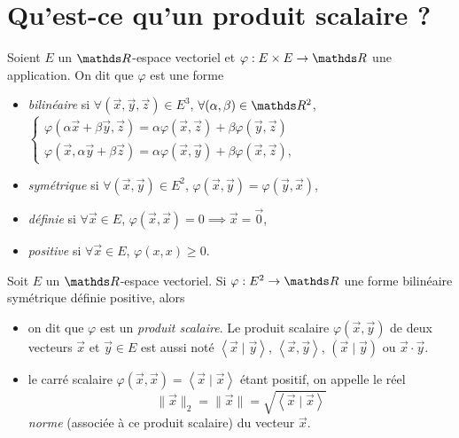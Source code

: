 \section{Qu'est-ce qu'un produit scalaire ?}

\begin{defn}
	Soient $E$\/ un $\R$-espace vectoriel et $\varphi : E \times E \to \R$\/ une application. On dit que $\varphi$\/ est une forme
	\begin{itemize}
		\item \textit{bilinéaire} si $\forall (\vec{x},\vec{y},\vec{z}) \in E^3$, $\forall (\alpha, \beta) \in \R^2$,  $\begin{cases}
				\varphi(\alpha \vec{x} + \beta \vec{y}, \vec{z}) = \alpha \varphi(\vec{x},\vec{z}) + \beta \varphi(\vec{y}, \vec{z})\\
				\varphi(\vec{x}, \alpha \vec{y} + \beta \vec{z}) = \alpha \varphi(\vec{x}, \vec{y}) + \beta \varphi(\vec{x},\vec{z}),
			\end{cases}$ 
		\item \textit{symétrique} si $\forall (\vec{x},\vec{y}) \in E^2$, $\varphi(\vec{x},\vec{y}) = \varphi(\vec{y},\vec{x})$,
		\item \textit{définie} si $\forall \vec{x} \in E$, \quad $\varphi(\vec{x},\vec{x}) = 0 \implies \vec{x} = \vec{0}$,
		\item \textit{positive} si $\forall \vec{x} \in E$, $\varphi(x,x) \ge 0$.
	\end{itemize}
\end{defn}

\begin{defn}
	Soit $E$\/ un $\R$-espace vectoriel. Si $\varphi : E^2 \to \R$\/ une forme bilinéaire symétrique définie positive, alors
	\begin{itemize}
		\item on dit que $\varphi$\/ est un \textit{produit scalaire}. Le produit scalaire $\varphi(\vec{x}, \vec{y})$\/ de deux vecteurs $\vec{x}$\/ et $\vec{y} \in E$\/ est aussi noté $\left<\vec{x} \mid \vec{y} \right>$, $\left<\vec{x},\vec{y} \right>$, $(\vec{x}  \mid \vec{y})$\/ ou $\vec{x}\cdot \vec{y}$.
		\item le carré scalaire $\varphi(\vec{x},\vec{x}) = \left<\vec{x} \mid \vec{x} \right>$\/ étant positif, on appelle le réel \[
			\|\vec{x}\|_2 = \|\vec{x}\| = \sqrt{\left<\vec{x}  \mid \vec{x} \right>}
		\] \textit{norme} (associée à ce produit scalaire) du vecteur $\vec{x}$.
	\end{itemize}
\end{defn}

